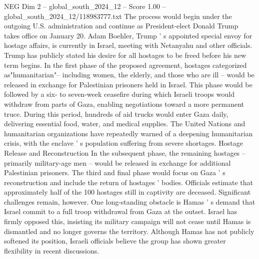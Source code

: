 \begin{textsample}{NEG Dim 2 – global\_south\_2024\_12 – Score 1.00 – global\_south\_2024\_12/118983777.txt}
The process would begin under the outgoing U.S. administration and continue as President-elect Donald Trump takes office on January 20.
Adam Boehler, Trump ' s appointed special envoy for hostage affairs, is currently in Israel, meeting with Netanyahu and other officials.
Trump has publicly stated his desire for all hostages to be freed before his new term begins.
In the first phase of the proposed agreement, hostages categorized as"humanitarian"-- including women, the elderly, and those who are ill -- would be released in exchange for Palestinian prisoners held in Israel.
This phase would be followed by a six- to seven-week ceasefire during which Israeli troops would withdraw from parts of Gaza, enabling negotiations toward a more permanent truce.
During this period, hundreds of aid trucks would enter Gaza daily, delivering essential food, water, and medical supplies.
The United Nations and humanitarian organizations have repeatedly warned of a deepening humanitarian crisis, with the enclave ' s population suffering from severe shortages.
Hostage Release and Reconstruction In the subsequent phase, the remaining hostages -- primarily military-age men -- would be released in exchange for additional Palestinian prisoners.
The third and final phase would focus on Gaza ' s reconstruction and include the return of hostages ' bodies.
Officials estimate that approximately half of the 100 hostages still in captivity are deceased.
Significant challenges remain, however.
One long-standing obstacle is Hamas ' s demand that Israel commit to a full troop withdrawal from Gaza at the outset.
Israel has firmly opposed this, insisting its military campaign will not cease until Hamas is dismantled and no longer governs the territory.
Although Hamas has not publicly softened its position, Israeli officials believe the group has shown greater flexibility in recent discussions.

\end{textsample}
